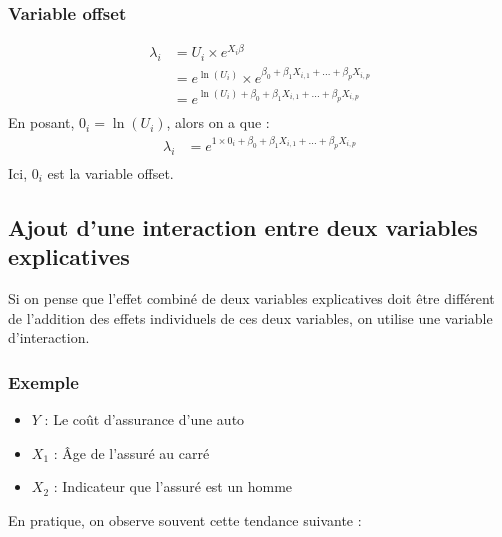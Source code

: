 \documentclass[11pt,french]{report}
\begin{document}
\subsubsection*{Variable offset}
\begin{align*}
\lambda_i &= U_i \times e^{X_i\beta} \\
&= e^{\ln(U_i)} \times e^{\beta_0 + \beta_1X_{i,1} + ... + \beta_pX_{i,p}} \\
&= e^{\ln(U_i) + \beta_0 + \beta_1X_{i,1} + ... + \beta_pX_{i,p}} \\
\end{align*}
En posant, $0_i = \ln(U_i)$, alors on a que :
\begin{align*}
\lambda_i &= e^{1 \times 0_i + \beta_0 + \beta_1X_{i,1} + ... + \beta_pX_{i,p}} \\
\end{align*}
Ici, $0_i$ est la variable offset.

\subsection{Ajout d'une interaction entre deux variables explicatives}
Si on pense que l'effet combiné de deux variables explicatives doit être différent de l'addition des effets individuels de ces deux variables, on utilise une variable d'interaction.

\subsubsection{Exemple}
\begin{itemize}
\item $Y$ : Le coût d'assurance d'une auto
\item $X_1$ : Âge de l'assuré au carré
\item $X_2$ : Indicateur que l'assuré est un homme
\end{itemize}

En pratique, on observe souvent cette tendance suivante :
\end{document}
